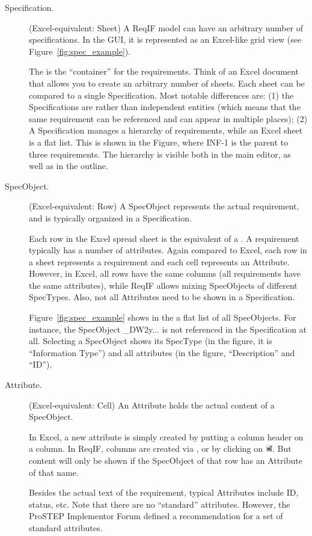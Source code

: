 \begin{description}
  \item[Specification.] (Excel-equivalent: Sheet) A ReqIF model can have an arbitrary number of specifications. In the GUI, it is represented as an Excel-like grid view (see Figure~\ref{fig:spec_example}).

 The  is the ``container'' for the requirements.  Think of an Excel document that allows you to create an arbitrary number of sheets.  Each sheet can be compared to a single Specification.  Most notable differences are: (1) the Specifications are  rather than independent entities (which means that the same requirement can be referenced and can appear in multiple places); (2) A Specification manages a hierarchy of requirements, while an Excel sheet is a flat list.  This is shown in the Figure, where INF-1 is the parent to three requirements.  The hierarchy is visible both in the main editor, as well as in the outline.

\item[SpecObject.] (Excel-equivalent: Row) A SpecObject represents the actual requirement, and is typically organized in a Specification.

Each row in the Excel spread sheet is the equivalent of a .  A requirement typically has a number of attributes.  Again compared to Excel, each row in a sheet represents a requirement and each cell represents an Attribute.  However, in Excel, all rows have the same columns (all requirements have the same attributes), while ReqIF allows mixing SpecObjects of different SpecTypes.  Also, not all Attributes need to be shown in a Specification.  

Figure~\ref{fig:spec_example} shows in the  a flat list of all SpecObjects.  For instance, the SpecObject \_DW2y... is not referenced in the Specification at all.  Selecting a SpecObject shows its SpecType (in the figure, it is ``Information Type'') and all attributes (in the figure, ``Description'' and ``ID'').

  \item[Attribute.] (Excel-equivalent: Cell) An Attribute holds the actual content of a SpecObject.

In Excel, a new attribute is simply created by putting a column header on a column.  In ReqIF, columns are created via , or by clicking on \includegraphics[height=0.8em]{../rmf-images/icons/full/obj16/ProRSpecViewConfiguration.png}.  But content will only be shown if the SpecObject of that row has an Attribute of that name.

Besides the actual text of the requirement, typical Attributes include ID, status, etc.  Note that there are no ``standard'' attributes.  However, the ProSTEP Implementor Forum defined a recommendation for a set of standard attributes.

\end{description}


